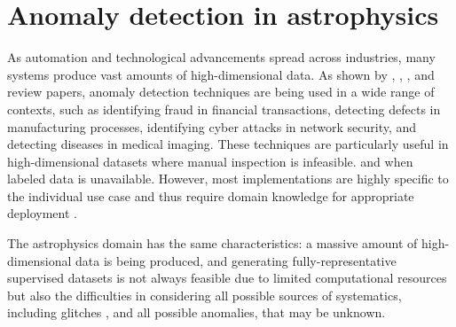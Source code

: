 \section{Anomaly detection in astrophysics}
\label{ss:ad-astrophysics}
As automation and technological advancements spread across industries, many systems produce vast amounts of high-dimensional data. As shown by \cite{chandola_2019}, \cite{blazquez2020review}, \cite{choi2021deep}, and \cite{Garg_2021} review papers, anomaly detection techniques are being used in a wide range of contexts, such as identifying fraud in financial transactions, detecting defects in manufacturing processes, identifying cyber attacks in network security, and detecting diseases in medical imaging. These techniques are particularly useful in high-dimensional datasets where manual inspection is infeasible. and when labeled data is unavailable. However, most implementations are highly specific to the individual use case and thus require domain knowledge for appropriate deployment \cite{choi2021deep}. 

The astrophysics domain has the same characteristics: a massive amount of high-dimensional data is being produced, and generating fully-representative supervised datasets is not always feasible due to limited computational resources but also the difficulties in considering all possible sources of systematics, including glitches \cite{Sadeh_2020}, and all possible anomalies, that may be unknown.

